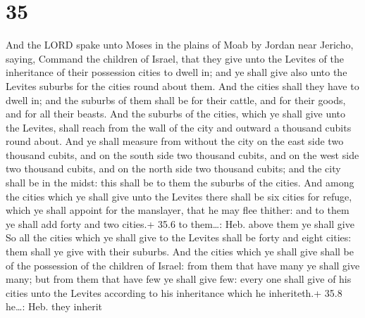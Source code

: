 \hypertarget{section-34}{%
\section{35}\label{section-34}}

 And the LORD spake unto Moses in the plains of Moab by
Jordan near Jericho, saying,  Command the children of
Israel, that they give unto the Levites of the inheritance of their
possession cities to dwell in; and ye shall give also unto the Levites
suburbs for the cities round about them.  And the cities
shall they have to dwell in; and the suburbs of them shall be for their
cattle, and for their goods, and for all their beasts.  And
the suburbs of the cities, which ye shall give unto the Levites, shall
reach from the wall of the city and outward a thousand cubits round
about.  And ye shall measure from without the city on the
east side two thousand cubits, and on the south side two thousand
cubits, and on the west side two thousand cubits, and on the north side
two thousand cubits; and the city shall be in the midst: this shall be
to them the suburbs of the cities.  And among the cities
which ye shall give unto the Levites there shall be six cities for
refuge, which ye shall appoint for the manslayer, that he may flee
thither: and to them ye shall add forty and two cities.+ 35.6 to
them\ldots: Heb. above them ye shall give  So all the cities
which ye shall give to the Levites shall be forty and eight cities: them
shall ye give with their suburbs.  And the cities which ye
shall give shall be of the possession of the children of Israel: from
them that have many ye shall give many; but from them that have few ye
shall give few: every one shall give of his cities unto the Levites
according to his inheritance which he inheriteth.+ 35.8 he\ldots: Heb.
they inherit

